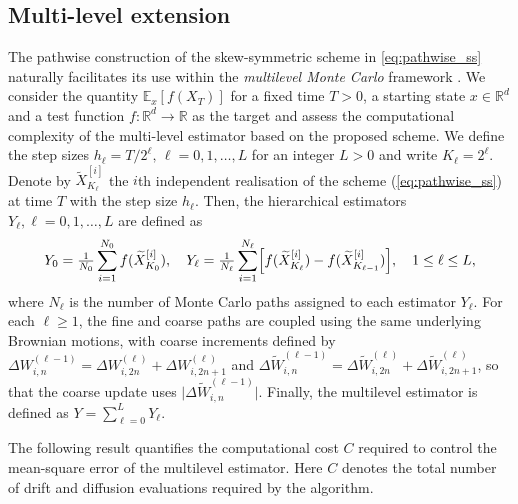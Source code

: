 \documentclass[11pt]{article}
\begin{document}
\subsection{Multi-level extension}\label{sec:multi.level.def} 
The pathwise construction of the skew-symmetric scheme in \eqref{eq:pathwise_ss} naturally facilitates its use within the \emph{multilevel Monte Carlo} framework \cite{Giles:08, Hut:13}. We consider the quantity $\mathbb{E}_x [f (X_T)]$ for a fixed time $T >0$, a starting state $x \in \mathbb{R}^d$ and a test function $f: \mathbb{R}^d \to \mathbb{R}$ as the target and assess the computational complexity of the multi-level estimator based on the proposed scheme. We define the step sizes $h_\ell = T / 2^{\ell}, \, \ell = 0, 1, \ldots, L$ for an integer $L > 0$ and write %
$K_\ell = 2^{\ell}$. Denote by $\widetilde{X}_{K_\ell}^{[i]}$ the $i$th independent realisation of the scheme (\ref{eq:pathwise_ss}) at time $T$ with the step size $h_\ell$. Then, the hierarchical estimators $Y_\ell, \ell = 0, 1, \ldots, L$ are defined as  
% 
\begin{align}
Y_0 = \tfrac{1}{N_0} \sum_{i = 1}^{N_0} f (\widetilde{X}_{K_0}^{[i]}), 
\quad  
Y_\ell = \tfrac{1}{N_\ell} \sum_{i = 1}^{N_\ell} \Bigl[ 
f (\widetilde{X}_{K_{\ell}}^{[i]})
- f (\widetilde{X}_{K_{\ell - 1}}^{[i]}) 
\Bigr], \quad  1 \le \ell \le L, 
\end{align}
% 
where $N_\ell$ is the number of Monte Carlo paths assigned to each estimator $Y_\ell$. For each $\ell \geq 1$, the fine and coarse paths are coupled using the same underlying Brownian motions, with coarse increments defined by $\Delta W_{i,n}^{(\ell-1)}=\Delta W_{i,2n}^{(\ell)}+\Delta W_{i,2n+1}^{(\ell)}$ and $\Delta\widetilde W_{i,n}^{(\ell-1)}=\Delta\widetilde W_{i,2n}^{(\ell)}+\Delta\widetilde W_{i,2n+1}^{(\ell)}$, so that the coarse update uses $\bigl|\Delta\widetilde W_{i,n}^{(\ell-1)}\bigr|$.  Finally, the multilevel estimator is defined as $Y = \sum_{\ell=0}^L Y_{\ell}$. 

The following result quantifies the computational cost $C$ required to control the mean-square error of the multilevel estimator. Here $C$ denotes the total number of drift and diffusion evaluations required by the algorithm.
% 
\end{document}

